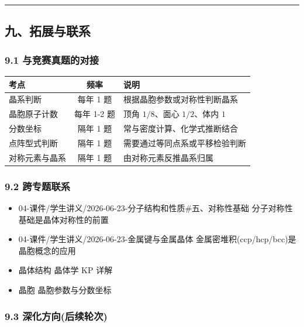 \begin{center}\rule{0.5\linewidth}{0.5pt}\end{center}

\subsection{九、拓展与联系}\label{ux4e5dux62d3ux5c55ux4e0eux8054ux7cfb}

\subsubsection{9.1 与竞赛真题的对接}\label{ux4e0eux7adeux8d5bux771fux9898ux7684ux5bf9ux63a5}

{\def\LTcaptype{none} %
\begin{longtable}[]{@{}lcl@{}}
\toprule\noalign{}
考点 & 频率 & 说明 \\
\midrule\noalign{}
\endhead
\bottomrule\noalign{}
\endlastfoot
晶系判断 & 每年 1 题 & 根据晶胞参数或对称性判断晶系 \\
晶胞原子计数 & 每年 1-2 题 & 顶角 \(1/8\)、面心 \(1/2\)、体内 \(1\) \\
分数坐标 & 隔年 1 题 & 常与密度计算、化学式推断结合 \\
点阵型式判断 & 隔年 1 题 & 需要通过等同点系或平移检验判断 \\
对称元素与晶系 & 隔年 1 题 & 由对称元素反推晶系归属 \\
\end{longtable}
}

\subsubsection{9.2 跨专题联系}\label{ux8de8ux4e13ux9898ux8054ux7cfb}

\begin{itemize}
\tightlist
\item
  04-课件/学生讲义/2026-06-23-分子结构和性质\#五、对称性基础 \箭 分子对称性基础是晶体对称性的前置
\item
  04-课件/学生讲义/2026-06-23-金属键与金属晶体 \箭 金属密堆积(ccp/hcp/bcc)是晶胞概念的应用
\item
  晶体结构 \箭 晶体学 KP 详解
\item
  晶胞 \箭 晶胞参数与分数坐标
\end{itemize}

\subsubsection{9.3 深化方向(后续轮次)}\label{ux6df1ux5316ux65b9ux5411ux540eux7eedux8f6eux6b21}

